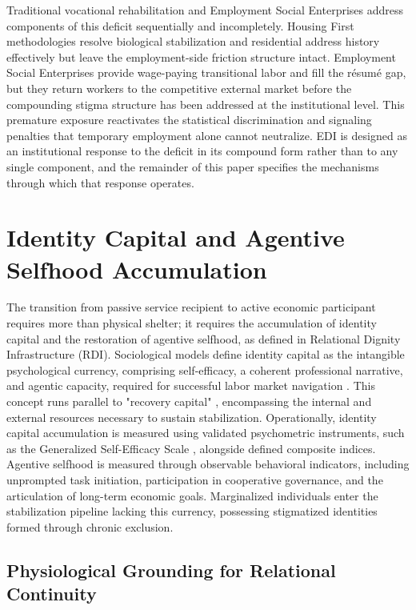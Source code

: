 \documentclass[12pt, letterpaper]{article}
\begin{document}
Traditional vocational rehabilitation and Employment Social Enterprises address components of this deficit sequentially and incompletely. Housing First methodologies \cite{tsemberis2004housing} resolve biological stabilization and residential address history effectively but leave the employment-side friction structure intact. Employment Social Enterprises provide wage-paying transitional labor and fill the r\'{e}sum\'{e} gap, but they return workers to the competitive external market before the compounding stigma structure has been addressed at the institutional level. This premature exposure reactivates the statistical discrimination and signaling penalties that temporary employment alone cannot neutralize. EDI is designed as an institutional response to the deficit in its compound form rather than to any single component, and the remainder of this paper specifies the mechanisms through which that response operates.

\section{Identity Capital and Agentive Selfhood Accumulation}

The transition from passive service recipient to active economic participant requires more than physical shelter; it requires the accumulation of identity capital and the restoration of agentive selfhood, as defined in Relational Dignity Infrastructure (RDI). Sociological models define identity capital as the intangible psychological currency, comprising self-efficacy, a coherent professional narrative, and agentic capacity, required for successful labor market navigation \cite{cote2002identity}. This concept runs parallel to "recovery capital" \cite{white2008recovery}, encompassing the internal and external resources necessary to sustain stabilization. Operationally, identity capital accumulation is measured using validated psychometric instruments, such as the Generalized Self-Efficacy Scale \cite{schwarzer1995generalized}, alongside defined composite indices. Agentive selfhood is measured through observable behavioral indicators, including unprompted task initiation, participation in cooperative governance, and the articulation of long-term economic goals. Marginalized individuals enter the stabilization pipeline lacking this currency, possessing stigmatized identities formed through chronic exclusion.

\subsection{Physiological Grounding for Relational Continuity}
\end{document}

